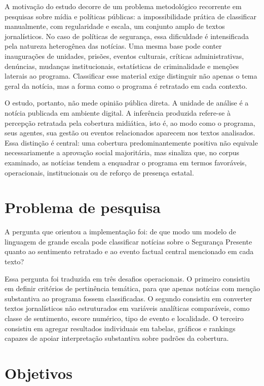 \documentclass[12pt,a4paper]{article}
\begin{document}
A motivação do estudo decorre de um problema metodológico recorrente em pesquisas sobre mídia e políticas públicas: a impossibilidade prática de classificar manualmente, com regularidade e escala, um conjunto amplo de textos jornalísticos. No caso de políticas de segurança, essa dificuldade é intensificada pela natureza heterogênea das notícias. Uma mesma base pode conter inaugurações de unidades, prisões, eventos culturais, críticas administrativas, denúncias, mudanças institucionais, estatísticas de criminalidade e menções laterais ao programa. Classificar esse material exige distinguir não apenas o tema geral da notícia, mas a forma como o programa é retratado em cada contexto.

O estudo, portanto, não mede opinião pública direta. A unidade de análise é a notícia publicada em ambiente digital. A inferência produzida refere-se à percepção retratada pela cobertura midiática, isto é, ao modo como o programa, seus agentes, sua gestão ou eventos relacionados aparecem nos textos analisados. Essa distinção é central: uma cobertura predominantemente positiva não equivale necessariamente a aprovação social majoritária, mas sinaliza que, no corpus examinado, as notícias tendem a enquadrar o programa em termos favoráveis, operacionais, institucionais ou de reforço de presença estatal.

\section{Problema de pesquisa}

A pergunta que orientou a implementação foi: de que modo um modelo de linguagem de grande escala pode classificar notícias sobre o Segurança Presente quanto ao sentimento retratado e ao evento factual central mencionado em cada texto?

Essa pergunta foi traduzida em três desafios operacionais. O primeiro consistiu em definir critérios de pertinência temática, para que apenas notícias com menção substantiva ao programa fossem classificadas. O segundo consistiu em converter textos jornalísticos não estruturados em variáveis analíticas comparáveis, como classe de sentimento, escore numérico, tipo de evento e localidade. O terceiro consistiu em agregar resultados individuais em tabelas, gráficos e rankings capazes de apoiar interpretação substantiva sobre padrões da cobertura.

\section{Objetivos}
\end{document}
